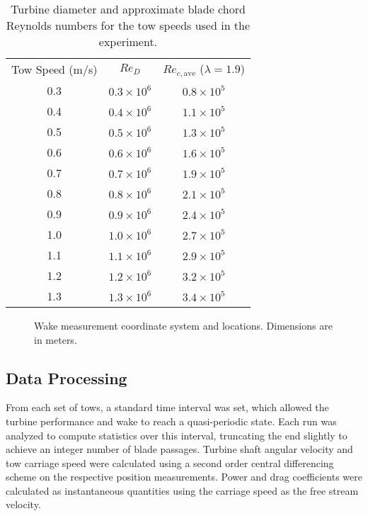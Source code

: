 \begin{table}[ht]
\centering
\begin{tabular}{ccc}
    Tow Speed (m/s) & $Re_D$ & $Re_{c,\mathrm{ave}}$ ($\lambda = 1.9$) \\
    0.3 & $0.3 \times 10^6$ & $0.8 \times 10^5$ \\
    0.4 & $0.4 \times 10^6$ & $1.1 \times 10^5$ \\
    0.5 & $0.5 \times 10^6$ & $1.3 \times 10^5$ \\
    0.6 & $0.6 \times 10^6$ & $1.6 \times 10^5$ \\
    0.7 & $0.7 \times 10^6$ & $1.9 \times 10^5$ \\
    0.8 & $0.8 \times 10^6$ & $2.1 \times 10^5$ \\
    0.9 & $0.9 \times 10^6$ & $2.4 \times 10^5$ \\
    1.0 & $1.0 \times 10^6$ & $2.7 \times 10^5$ \\
    1.1 & $1.1 \times 10^6$ & $2.9 \times 10^5$ \\
    1.2 & $1.2 \times 10^6$ & $3.2 \times 10^5$ \\
    1.3 & $1.3 \times 10^6$ & $3.4 \times 10^5$ \\
\end{tabular}
\caption{Turbine diameter and approximate blade chord Reynolds numbers for the
    tow speeds used in the experiment.}
\label{tab:Re}
\end{table}
\unskip


\begin{figure}[ht]
\centering


\caption{Wake measurement coordinate system and locations. Dimensions are in
    meters.}

\label{fig:wake-locations}
\end{figure}


\subsection{Data Processing}

From each set of tows, a standard time interval was set, which allowed the
turbine performance and wake to reach a quasi-periodic state. Each run was
analyzed to compute statistics over this interval, truncating the end slightly
to achieve an integer number of blade passages. Turbine shaft angular velocity
and tow carriage speed were calculated using a second order central differencing
scheme on the respective position measurements. Power and drag coefficients were
calculated as instantaneous quantities using the carriage speed as the free
stream velocity.

